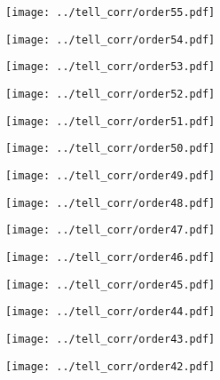 \documentclass{article}
\begin{document}
\begin{figure}[H]
    \centering
    \texttt{[image: ../tell\_corr/order55.pdf]}
\end{figure}
\begin{figure}[H]
    \centering
    \texttt{[image: ../tell\_corr/order54.pdf]}
\end{figure}
\begin{figure}[H]
    \centering
    \texttt{[image: ../tell\_corr/order53.pdf]}
\end{figure}
\begin{figure}[H]
    \centering
    \texttt{[image: ../tell\_corr/order52.pdf]}
\end{figure}
\begin{figure}[H]
    \centering
    \texttt{[image: ../tell\_corr/order51.pdf]}
\end{figure}
\begin{figure}[H]
    \centering
    \texttt{[image: ../tell\_corr/order50.pdf]}
\end{figure}
\begin{figure}[H]
    \centering
    \texttt{[image: ../tell\_corr/order49.pdf]}
\end{figure}
\begin{figure}[H]
    \centering
    \texttt{[image: ../tell\_corr/order48.pdf]}
\end{figure}
\begin{figure}[H]
    \centering
    \texttt{[image: ../tell\_corr/order47.pdf]}
\end{figure}
\begin{figure}[H]
    \centering
    \texttt{[image: ../tell\_corr/order46.pdf]}
\end{figure}
\begin{figure}[H]
    \centering
    \texttt{[image: ../tell\_corr/order45.pdf]}
\end{figure}
\begin{figure}[H]
    \centering
    \texttt{[image: ../tell\_corr/order44.pdf]}
\end{figure}
\begin{figure}[H]
    \centering
    \texttt{[image: ../tell\_corr/order43.pdf]}
\end{figure}
\begin{figure}[H]
    \centering
    \texttt{[image: ../tell\_corr/order42.pdf]}
\end{figure}
\end{document}
